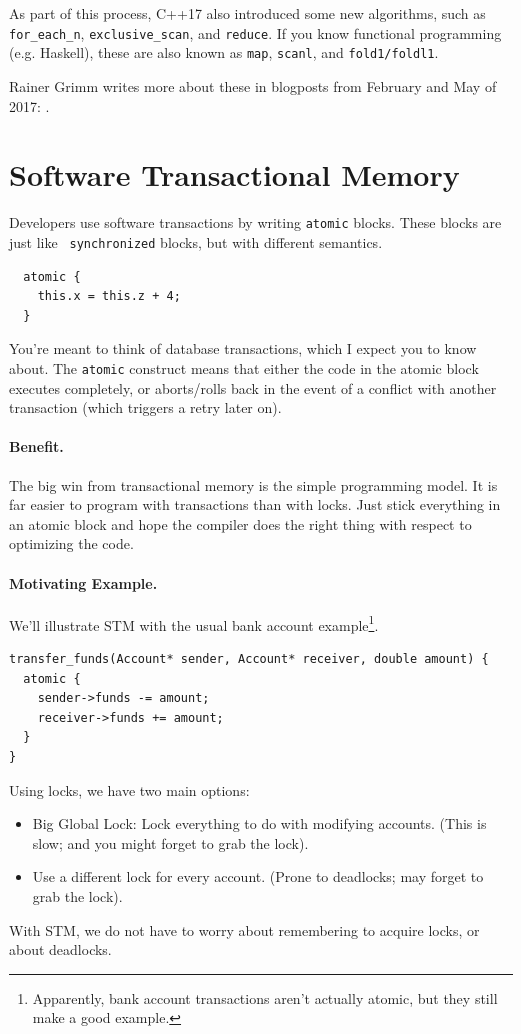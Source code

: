\documentclass[a4paper]{report}
\begin{document}
As part of this process, C++17 also introduced some new algorithms, such as
{\tt for\_each\_n}, {\tt exclusive\_scan}, and {\tt reduce}.
If you know functional programming (e.g. Haskell), these are also known as
{\tt map}, {\tt scanl}, and {\tt fold1/foldl1}.

Rainer Grimm writes more about these in blogposts from February and May of 2017:
\cite{grimm17:_paral_algor_stand_templ_librar} \cite{grimm17:_c}.

\section*{Software Transactional Memory}
Developers use software transactions by 
writing {\tt atomic} blocks. These blocks are just like {\tt
  synchronized} blocks, but with different semantics.
\begin{lstlisting}
  atomic {
    this.x = this.z + 4;
  }
\end{lstlisting}
You're meant to think of database transactions, which I expect you to
know about. The {\tt atomic} construct means that either the code in
the atomic block executes completely, or aborts/rolls back in the
event of a conflict with another transaction (which triggers a retry
later on).

\paragraph{Benefit.} The big win from transactional memory is the simple
programming model. It is far easier to program with transactions than with
locks. Just stick everything in an atomic block and hope the compiler does the
right thing with respect to optimizing the code.

\paragraph{Motivating Example.} We'll illustrate STM with the usual bank account example\footnote{Apparently, bank account transactions aren't actually atomic, but they still make a good example.}.
  \begin{lstlisting}
transfer_funds(Account* sender, Account* receiver, double amount) {
  atomic {
    sender->funds -= amount;
    receiver->funds += amount;
  }
}
  \end{lstlisting}

Using locks, we have two main options:
      \begin{itemize}
        \item Big Global Lock: Lock everything to do with modifying accounts. (This is slow; and you might forget to grab the lock).
        \item Use a different lock for every account. (Prone to deadlocks; may forget to grab the lock).
      \end{itemize}
With STM, we do not have to worry about remembering to acquire locks,
or about deadlocks.
\end{document}
